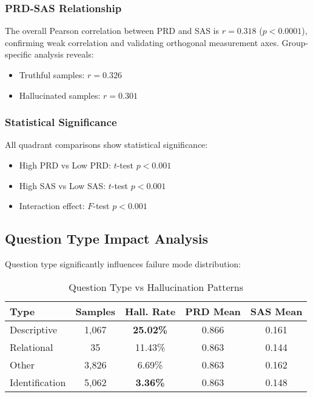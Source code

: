 \subsubsection{PRD-SAS Relationship}
The overall Pearson correlation between PRD and SAS is $r = 0.318$ ($p < 0.0001$), confirming weak correlation and validating orthogonal measurement axes. Group-specific analysis reveals:
\begin{itemize}
    \item Truthful samples: $r = 0.326$
    \item Hallucinated samples: $r = 0.301$
\end{itemize}

\subsubsection{Statistical Significance}
All quadrant comparisons show statistical significance:
\begin{itemize}
    \item High PRD vs Low PRD: $t$-test $p < 0.001$
    \item High SAS vs Low SAS: $t$-test $p < 0.001$
    \item Interaction effect: $F$-test $p < 0.001$
\end{itemize}

\subsection{Question Type Impact Analysis}

Question type significantly influences failure mode distribution:

\begin{table}[h]
\centering
\caption{Question Type vs Hallucination Patterns}
\label{tab:question_analysis}
\begin{tabular}{lcccc}
\toprule
\textbf{Type} & \textbf{Samples} & \textbf{Hall. Rate} & \textbf{PRD Mean} & \textbf{SAS Mean} \\
\midrule
Descriptive & 1,067 & \textbf{25.02\%} & 0.866 & 0.161 \\
Relational & 35 & 11.43\% & 0.863 & 0.144 \\
Other & 3,826 & 6.69\% & 0.863 & 0.162 \\
Identification & 5,062 & \textbf{3.36\%} & 0.863 & 0.148 \\
\bottomrule
\end{tabular}
\end{table}

